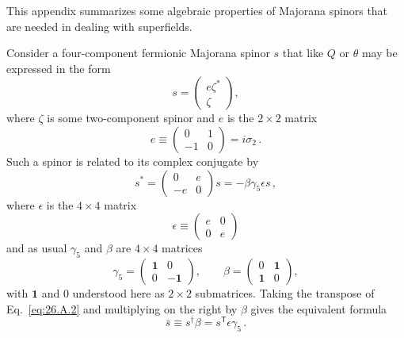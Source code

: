 

This appendix summarizes some algebraic properties of Majorana spinors that
are needed in dealing with superfields.

Consider a four-component fermionic Majorana spinor $s$ that like $Q$ or
$\theta$ may be expressed in the form
\begin{equation}
  s=
  \begin{pmatrix}
    e\zeta^*\\
    \zeta
  \end{pmatrix},
  \tag{26.A.1}\label{eq:26.A.1}
\end{equation}
where $\zeta$ is some two-component spinor and $e$ is the $2\times2$ matrix
\[
  e\equiv
  \begin{pmatrix}
    0&1\\
    -1&0
  \end{pmatrix}
  =i\sigma_2\,.
\]
Such a spinor is related to its complex conjugate by
\begin{equation}
  s^*=
  \begin{pmatrix}
    0&e\\
    -e&0
  \end{pmatrix}s
  =-\beta\gamma_5\epsilon s\,,
  \tag{26.A.2}\label{eq:26.A.2}
\end{equation}
where $\epsilon$ is the $4\times4$ matrix
\begin{equation}
  \epsilon\equiv
  \begin{pmatrix}
    e&0\\
    0&e
  \end{pmatrix}
  \tag{26.A.3}\label{eq:26.A.3}
\end{equation}
and as usual $\gamma_5$ and $\beta$ are $4\times4$ matrices
\[
  \gamma_5=
  \begin{pmatrix}
    \mathbf{1}&0\\
    0&-\mathbf{1}
  \end{pmatrix},
  \qquad
  \beta=
  \begin{pmatrix}
    0&\mathbf{1}\\
    \mathbf{1}&0
  \end{pmatrix},
\]
with $\mathbf{1}$ and $0$ understood here as $2\times2$ submatrices. Taking
the transpose of Eq.~\eqref{eq:26.A.2} and multiplying on the right by
$\beta$ gives the equivalent formula
\begin{equation}
  \bar{s}\equiv s^\dagger\beta=s^{\mathsf T}\epsilon\gamma_5\,.
  \tag{26.A.4}\label{eq:26.A.4}
\end{equation}

